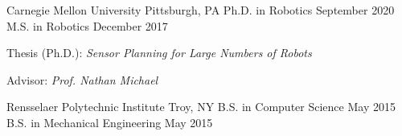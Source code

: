 
\begin{cventries}
  \cventrytwo
  {Carnegie Mellon University}
  {Pittsburgh, PA}
  {Ph.D. in Robotics}
  {September 2020}
  {}
  {M.S. in Robotics}
  {December 2017}
  {
    \begin{cvitems} %
    \item {Thesis (Ph.D.): \emph{Sensor Planning for Large Numbers of Robots}}
    \item {Advisor: \emph{Prof. Nathan Michael}}
    \end{cvitems}
  }

  \cventrytwo
  {Rensselaer Polytechnic Institute} %
  {Troy, NY} %
  {B.S. in Computer Science} %
  {May 2015} %
  {}
  {B.S. in Mechanical Engineering} %
  {May 2015} %
  {}
\end{cventries}

